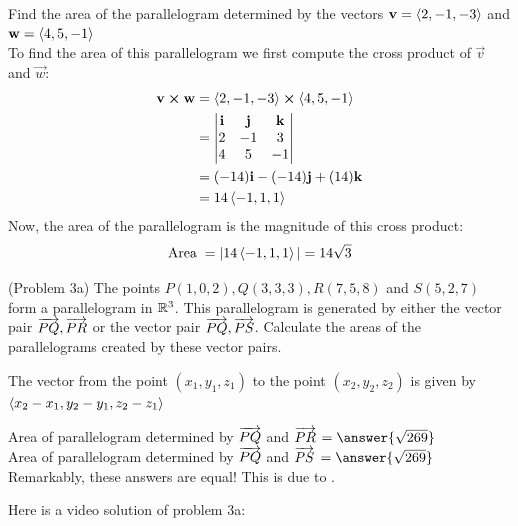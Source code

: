 \documentclass[handout]{ximera}
\begin{document}
\begin{example}[Example 3]
Find the area of the parallelogram determined by the vectors $\mathbf v = \left\langle 2, -1, -3\right\rangle$ and $\mathbf w = \left\langle 4, 5, -1\right\rangle$\\
To find the area of this parallelogram we first compute the cross product of $\vec v$ and $\vec w$:
\begin{align*}
\mathbf v \boldsymbol\times \mathbf w &= \left\langle 2, -1, -3\right\rangle \boldsymbol\times \left\langle 4, 5, -1\right\rangle\\
                    &=  \begin{vmatrix}
\mathbf{i} & \mathbf{j} & \mathbf{k}\\
2 & -1 & 3\\
4 & 5 & -1
\end{vmatrix}\\
&= (-14)\mathbf{i} - (-14)\mathbf{j} + (14)\mathbf{k}\\
&= 14 \left\langle -1, 1, 1\right\rangle
\end{align*}
Now, the area of the parallelogram is the magnitude of this cross product:
\[
\text{Area} \; = |14\left\langle -1, 1, 1\right\rangle| = 14\sqrt 3
\]
\end{example}

\begin{problem}(Problem 3a) The points $P(1,0,2), Q(3,3,3), R(7, 5, 8)$ and $S(5, 2, 7)$ form a parallelogram in $\mathbb R^3$.
This parallelogram is generated by either the vector pair $\overrightarrow{PQ}, \overrightarrow{PR}$ or the vector pair $\overrightarrow{PQ}, \overrightarrow{PS}$.
Calculate the areas of the parallelograms created by these vector pairs.\\
\begin{hint}
The vector from the point $(x_1, y_1, z_1)$ to the point $(x_2, y_2, z_2)$ is given by $\left\langle x_2-x_1, y_2-y_1, z_2-z_1\right\rangle$
\end{hint}
Area of parallelogram determined by $\overrightarrow{PQ}$ and $\overrightarrow{PR}$  $=\answer{\sqrt{269}}$\\
Area of parallelogram determined by $\overrightarrow{PQ}$ and $\overrightarrow{PS}$ $=\answer{\sqrt{269}}$\\
Remarkably, these answers are equal!  This is due to .
\end{problem}

Here is a video solution of problem 3a:\\
\begin{foldable}
\end{foldable}
\end{document}
